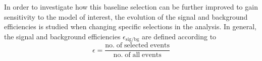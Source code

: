 In order to investigate how this baseline selection can be further improved to gain sensitivity to the model of interest, the evolution of the signal and background efficiencies is studied when changing specific selections in the analysis. In general, the signal and background efficiencies $\epsilon_\mathrm{sig/bg}$ are defined according to
\begin{equation}
\epsilon = \frac{\mathrm{no. \; of \; selected \; events}}{\mathrm{no. \; of \; all \; events}}
\end{equation} 
\begin{figure}[!t]
  \centering
{}
\end{figure}
